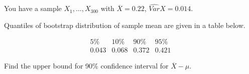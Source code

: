 
\begin{question}
You have a sample \(X_1, \dots, X_{300}\) with \(\overline{X}= 0.22\), \(\widehat{Var}{X} = 0.014\).

Quantiles of bootstrap distribution of sample mean are given in a table below.

\[
\begin{array}{c|c|c|c}
5 \% & 10 \% & 90 \% & 95 \% \\
\hline
0.043 & 0.068 & 0.372 & 0.421
\end{array}
\]

Find the upper bound for 90\% confidence interval for \(\overline{X}-\mu\).
\end{question}


